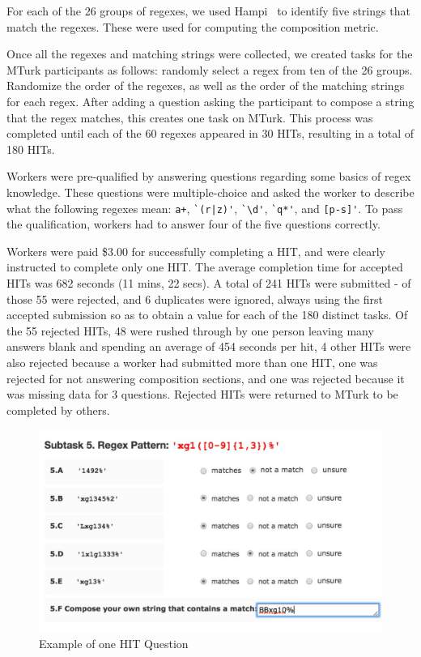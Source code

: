 For each of the 26 groups of regexes, we used Hampi~\cite{hampi} to identify five strings that match the regexes. These were used for computing the composition metric.

Once all the regexes and matching strings were collected, we created tasks for the MTurk participants as follows: randomly select a regex from ten of the 26 groups. Randomize the order of the regexes, as well as the order of the matching strings for each regex. After adding a question asking the participant to compose a string that the regex matches, this creates one task on MTurk. This process was completed until each of the 60 regexes appeared in 30 HITs, resulting in a total of 180 HITs.

Workers were pre-qualified by answering questions regarding some basics of regex knowledge. These questions were multiple-choice and asked the worker to describe what the following regexes mean: \verb!a+!, \verb!`(r|z)'!, \verb!`\d'!, \verb!`q*'!, and \verb![p-s]'!. To pass the qualification, workers had to answer four of the five questions correctly. 

Workers were paid \$3.00 for successfully completing a HIT, and were clearly instructed to complete only one HIT.  The average completion time for accepted HITs was 682 seconds (11 mins, 22 secs).  A total of 241 HITs were submitted - of those 55 were rejected, and 6 duplicates were ignored, always using the first accepted submission so as to obtain a value for each of the 180 distinct tasks.
Of the 55 rejected HITs, 48 were rushed through by one person leaving many answers blank and spending an average of 454 seconds per hit, 4 other HITs were also rejected because a worker had submitted more than one HIT, one was rejected for not answering composition sections, and one was rejected because it was missing data for 3 questions.  Rejected HITs were returned to MTurk to be completed by others.

\begin{figure}[tb]
\centering
\includegraphics[width=\columnwidth]{illustrations/exampleQuestion}
\vspace{-12pt}
\caption{Example of one HIT Question}
\vspace{-6pt}
\label{fig:exampleQuestion}
\end{figure}

